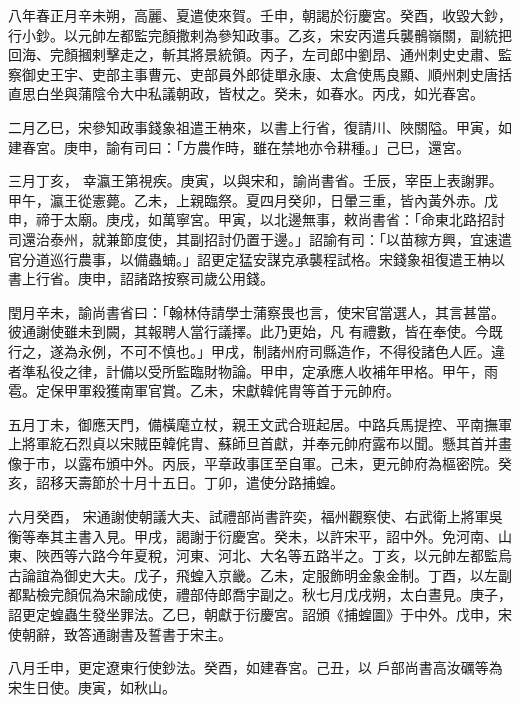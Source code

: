 \begin{pinyinscope}
 八年春正月辛未朔，高麗、夏遣使來賀。壬申，朝謁於衍慶宮。癸酉，收毀大鈔，行小鈔。以元帥左都監完顏撒剌為參知政事。乙亥，宋安丙遣兵襲鶻嶺關，副統把回海、完顏摑剌擊走之，斬其將景統領。丙子，左司郎中劉昂、通州刺史史肅、監察御史王宇、吏部主事曹元、吏部員外郎徒單永康、太倉使馬良顯、順州刺史唐括直思白坐與蒲陰令大中私議朝政，皆杖之。癸未，如春水。丙戌，如光春宮。



 二月乙巳，宋參知政事錢象祖遣王柟來，以書上行省，復請川、陜關隘。甲寅，如建春宮。庚申，諭有司曰：「方農作時，雖在禁地亦令耕種。」己巳，還宮。



 三月丁亥，
 幸瀛王第視疾。庚寅，以與宋和，諭尚書省。壬辰，宰臣上表謝罪。甲午，瀛王從憲薨。乙未，上親臨祭。夏四月癸卯，日暈三重，皆內黃外赤。戊申，禘于太廟。庚戌，如萬寧宮。甲寅，以北邊無事，敕尚書省：「命東北路招討司還治泰州，就兼節度使，其副招討仍置于邊。」詔諭有司：「以苗稼方興，宜速遣官分道巡行農事，以備蟲蝻。」詔更定猛安謀克承襲程試格。宋錢象祖復遣王柟以書上行省。庚申，詔諸路按察司歲公用錢。



 閏月辛未，諭尚書省曰：「翰林侍請學士蒲察畏也言，使宋官當選人，其言甚當。彼通謝使雖未到闕，其報聘人當行議擇。此乃更始，凡
 有禮數，皆在奉使。今既行之，遂為永例，不可不慎也。」甲戌，制諸州府司縣造作，不得役諸色人匠。違者準私役之律，計備以受所監臨財物論。甲申，定承應人收補年甲格。甲午，雨雹。定保甲軍殺獲南軍官賞。乙未，宋獻韓侂胄等首于元帥府。



 五月丁未，御應天門，備橫麾立杖，親王文武合班起居。中路兵馬提控、平南撫軍上將軍紇石烈貞以宋賊臣韓侂胄、蘇師旦首獻，并奉元帥府露布以聞。懸其首并畫像于市，以露布頒中外。丙辰，平章政事匡至自軍。己未，更元帥府為樞密院。癸亥，詔移天壽節於十月十五日。丁卯，遣使分路捕蝗。



 六月癸酉，
 宋通謝使朝議大夫、試禮部尚書許奕，福州觀察使、右武衛上將軍吳衡等奉其主書入見。甲戌，謁謝于衍慶宮。癸未，以許宋平，詔中外。免河南、山東、陜西等六路今年夏稅，河東、河北、大名等五路半之。丁亥，以元帥左都監烏古論誼為御史大夫。戊子，飛蝗入京畿。乙未，定服飾明金象金制。丁酉，以左副都點檢完顏侃為宋諭成使，禮部侍郎喬宇副之。秋七月戊戌朔，太白晝見。庚子，詔更定蝗蟲生發坐罪法。乙巳，朝獻于衍慶宮。詔頒《捕蝗圖》于中外。戊申，宋使朝辭，致答通謝書及誓書于宋主。



 八月壬申，更定遼東行使鈔法。癸酉，如建春宮。己丑，以
 戶部尚書高汝礪等為宋生日使。庚寅，如秋山。




\end{pinyinscope}
